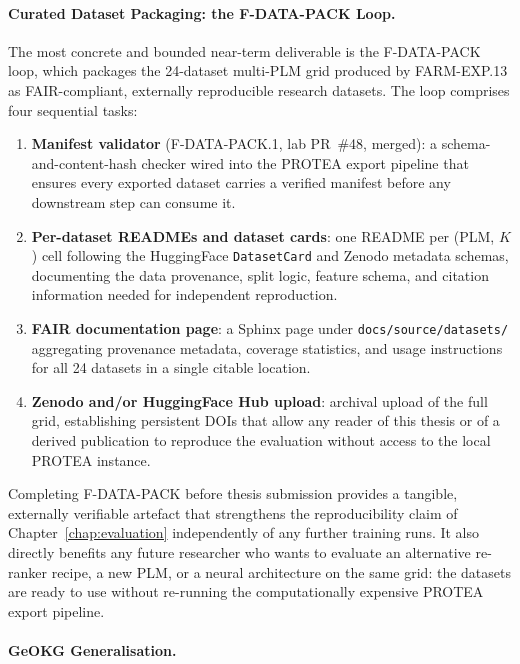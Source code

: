 \paragraph{Curated Dataset Packaging: the F-DATA-PACK Loop.}
\label{para:future-fdata-pack}

The most concrete and bounded near-term deliverable is the F-DATA-PACK loop,
which packages the 24-dataset multi-PLM grid produced by FARM-EXP.13 as
FAIR-compliant, externally reproducible research datasets. The loop comprises
four sequential tasks:

\begin{enumerate}
  \item \textbf{Manifest validator} (F-DATA-PACK.1, lab PR~\#48, merged):
    a schema-and-content-hash checker wired into the PROTEA export pipeline
    that ensures every exported dataset carries a verified manifest before any
    downstream step can consume it.
  \item \textbf{Per-dataset READMEs and dataset cards}: one README per
    (PLM, $K$) cell following the HuggingFace \texttt{DatasetCard} and Zenodo
    metadata schemas, documenting the data provenance, split logic, feature
    schema, and citation information needed for independent reproduction.
  \item \textbf{FAIR documentation page}: a Sphinx page under
    \texttt{docs/source/datasets/} aggregating provenance metadata, coverage
    statistics, and usage instructions for all 24 datasets in a single
    citable location.
  \item \textbf{Zenodo and/or HuggingFace Hub upload}: archival upload of the
    full grid, establishing persistent DOIs that allow any reader of
    this thesis or of a derived publication to reproduce the evaluation
    without access to the local PROTEA instance.
\end{enumerate}

Completing F-DATA-PACK before thesis submission provides a tangible,
externally verifiable artefact that strengthens the reproducibility claim of
Chapter~\ref{chap:evaluation} independently of any further training runs.
It also directly benefits any future researcher who wants to evaluate
an alternative re-ranker recipe, a new PLM, or a neural architecture on
the same grid: the datasets are ready to use without re-running the
computationally expensive PROTEA export pipeline.

\paragraph{GeOKG Generalisation.}
\label{para:future-geokg}

